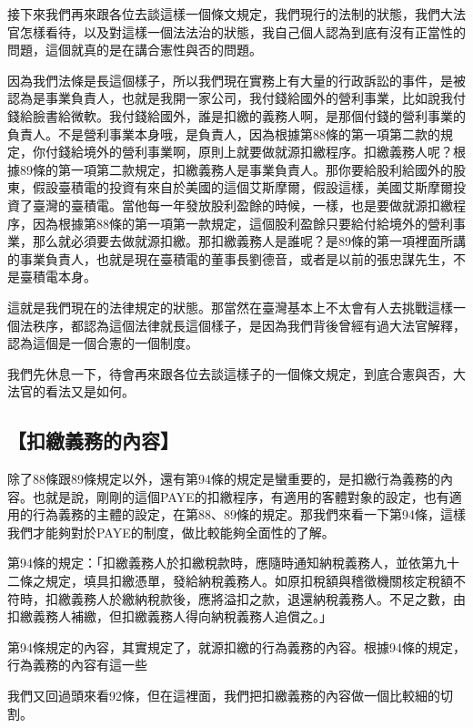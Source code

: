 \documentclass[oneside,sub3section]{ctexbook}
\begin{document}
接下來我們再來跟各位去談這樣一個條文規定，我們現行的法制的狀態，我們大法官怎樣看待，以及對這樣一個法法治的狀態，我自己個人認為到底有沒有正當性的問題，這個就真的是在講合憲性與否的問題。

因為我們法條是長這個樣子，所以我們現在實務上有大量的行政訴訟的事件，是被認為是事業負責人，也就是我開一家公司，我付錢給國外的營利事業，比如說我付錢給臉書給微軟。我付錢給國外，誰是扣繳的義務人啊，是那個付錢的營利事業的負責人。不是營利事業本身哦，是負責人，因為根據第88條的第一項第二款的規定，你付錢給境外的營利事業啊，原則上就要做就源扣繳程序。扣繳義務人呢？根據89條的第一項第二款規定，扣繳義務人是事業負責人。那你要給股利給國外的股東，假設臺積電的投資有來自於美國的這個艾斯摩爾，假設這樣，美國艾斯摩爾投資了臺灣的臺積電。當他每一年發放股利盈餘的時候，一樣，也是要做就源扣繳程序，因為根據第88條的第一項第一款規定，這個股利盈餘只要給付給境外的營利事業，那么就必須要去做就源扣繳。那扣繳義務人是誰呢？是89條的第一項裡面所講的事業負責人，也就是現在臺積電的董事長劉德音，或者是以前的張忠謀先生，不是臺積電本身。

這就是我們現在的法律規定的狀態。那當然在臺灣基本上不太會有人去挑戰這樣一個法秩序，都認為這個法律就長這個樣子，是因為我們背後曾經有過大法官解釋，認為這個是一個合憲的一個制度。

我們先休息一下，待會再來跟各位去談這樣子的一個條文規定，到底合憲與否，大法官的看法又是如何。

\hypertarget{ux6263ux7e73ux7fa9ux52d9ux7684ux5167ux5bb9}{%
\subsection{【扣繳義務的內容】}\label{ux6263ux7e73ux7fa9ux52d9ux7684ux5167ux5bb9}}

除了88條跟89條規定以外，還有第94條的規定是蠻重要的，是扣繳行為義務的內容。也就是說，剛剛的這個PAYE的扣繳程序，有適用的客體對象的設定，也有適用的行為義務的主體的設定，在第88、89條的規定。那我們來看一下第94條，這樣我們才能夠對於PAYE的制度，做比較能夠全面性的了解。

第94條的規定：「扣繳義務人於扣繳稅款時，應隨時通知納稅義務人，並依第九十二條之規定，填具扣繳憑單，發給納稅義務人。如原扣稅額與稽徵機關核定稅額不符時，扣繳義務人於繳納稅款後，應將溢扣之款，退還納稅義務人。不足之數，由扣繳義務人補繳，但扣繳義務人得向納稅義務人追償之。」

第94條規定的內容，其實規定了，就源扣繳的行為義務的內容。根據94條的規定，行為義務的內容有這一些

我們又回過頭來看92條，但在這裡面，我們把扣繳義務的內容做一個比較細的切割。
\end{document}
